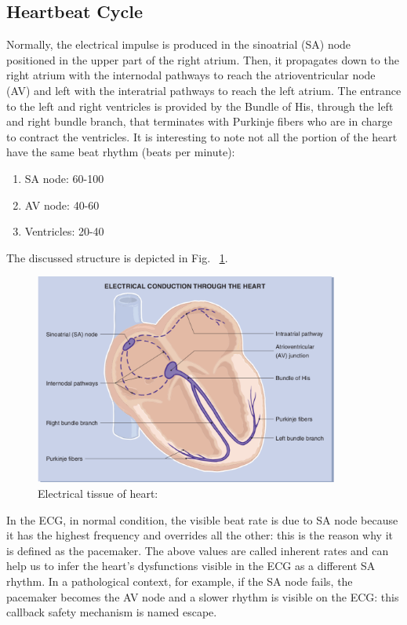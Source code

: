 \documentclass[LaM,binding=0.6cm]{sapthesis}
\begin{document}
\subsection{Heartbeat Cycle}
Normally, the electrical impulse is produced in the sinoatrial (SA) node positioned in the upper part of the right atrium. Then, it propagates down to the right atrium with the internodal pathways to reach the atrioventricular node (AV) and left with the interatrial pathways to reach the left atrium. The entrance to the left and right ventricles is provided by the Bundle of His, through the left and right bundle branch, that terminates with Purkinje fibers who are in charge to contract the ventricles. It is interesting to note not all the portion of the heart have the same beat rhythm (beats per minute):
\begin{enumerate}
\item SA node: 60-100  
\item AV node: 40-60 
\item Ventricles: 20-40 
\end{enumerate}
The discussed structure is depicted in Fig. ~\ref{fig:hearts}.
\begin{figure} \centering
    \includegraphics[width=100mm,scale=0.7]{heartex}
    \caption{Electrical tissue of heart: \cite{ecgbook}}
    \label{fig:hearts}
\end{figure}
In the ECG, in normal condition, the visible beat rate is due to SA node because it has the highest frequency and overrides all the other: this is the reason why it is defined as the pacemaker. The above values are called inherent rates and can help us to infer the heart's dysfunctions visible in the ECG as a different SA rhythm. In a pathological context, for example, if the SA node fails, the pacemaker becomes the AV node and a slower rhythm is visible on the ECG: this callback safety mechanism is named escape.
\end{document}

